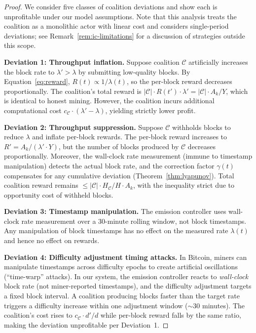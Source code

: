 \documentclass[11pt,a4paper]{article}
\theoremstyle{definition}
\theoremstyle{remark}
\newcommand{\Hashrate}{H}
\newcommand{\reward}{R}
\newcommand{\blockrate}{\lambda}
\begin{document}
\begin{proof}
We consider five classes of coalition deviations and show each is
unprofitable under our model assumptions.
Note that this analysis treats the coalition as a monolithic actor
with linear cost and considers single-period deviations; see
Remark~\ref{rem:ic-limitations} for a discussion of strategies
outside this scope.

\textbf{Deviation 1: Throughput inflation.}
Suppose coalition $\mathcal{C}$ artificially increases the block rate
to $\blockrate' > \blockrate$ by submitting low-quality blocks.
By Equation~\eqref{eq:reward}, $\reward(t) \propto 1/\blockrate(t)$,
so the per-block reward decreases proportionally.
The coalition's total reward is $|\mathcal{C}| \cdot \reward(t') \cdot
\blockrate' = |\mathcal{C}| \cdot A_k / Y$, which is identical to
honest mining.
However, the coalition incurs additional computational cost
$c_{\mathcal{C}} \cdot (\blockrate' - \blockrate)$, yielding strictly
lower profit.

\textbf{Deviation 2: Throughput suppression.}
Suppose $\mathcal{C}$ withholds blocks to reduce $\blockrate$ and
inflate per-block rewards.
The per-block reward increases to $\reward' = A_k / (\blockrate' \cdot Y)$,
but the number of blocks produced by $\mathcal{C}$ decreases proportionally.
Moreover, the wall-clock rate measurement (immune to timestamp
manipulation) detects the actual block rate, and the correction factor
$\gamma(t)$ compensates for any cumulative deviation
(Theorem~\ref{thm:lyapunov}).
Total coalition reward remains $\leq |\mathcal{C}| \cdot \Hashrate_{\mathcal{C}} / \Hashrate \cdot A_k$,
with the inequality strict due to opportunity cost of withheld blocks.

\textbf{Deviation 3: Timestamp manipulation.}
The emission controller uses wall-clock rate measurement over a
30-minute rolling window, not block timestamps.
Any manipulation of block timestamps has no effect on the measured
rate $\blockrate(t)$ and hence no effect on rewards.

\textbf{Deviation 4: Difficulty adjustment timing attacks.}
In Bitcoin, miners can manipulate timestamps across difficulty epochs to
create artificial oscillations (``time-warp'' attacks).
In our system, the emission controller reacts to \emph{wall-clock} block
rate (not miner-reported timestamps), and the difficulty adjustment targets
a fixed block interval.
A coalition producing blocks faster than the target rate triggers a
difficulty increase within one adjustment window ($\sim$30 minutes).
The coalition's cost rises to $c_\mathcal{C} \cdot d'/d$ while per-block
reward falls by the same ratio, making the deviation unprofitable per
Deviation~1.


\end{proof}
\end{document}
